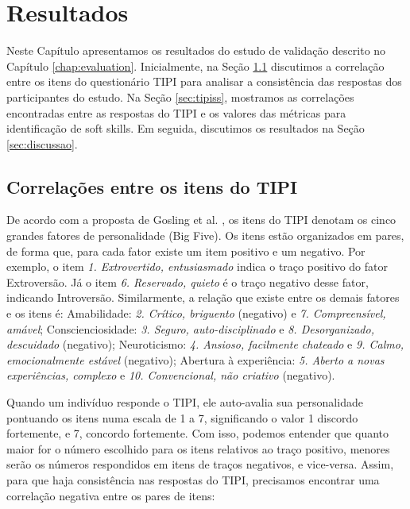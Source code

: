 

\chapter{Resultados}

\label{chap:results}

Neste Capítulo apresentamos os resultados do estudo de validação descrito no Capítulo \ref{chap:evaluation}. Inicialmente, na Seção \ref{sec:tipitipi} discutimos a correlação entre os itens do questionário TIPI para analisar a consistência das respostas dos participantes do estudo. Na Seção \ref{sec:tipiss}, mostramos as correlações encontradas entre as respostas do TIPI e os valores das métricas para identificação de soft skills. Em seguida, discutimos os resultados na Seção \ref{sec:discussao}.

\section{Correlações entre os itens do TIPI}
\label{sec:tipitipi}

De acordo com a proposta de Gosling et al. \cite{gosling:03}, os itens do TIPI denotam os cinco grandes fatores de personalidade (Big Five). Os itens estão organizados em pares, de forma que,
para cada fator existe um item positivo e um negativo.
Por exemplo, o item \textit{1. Extrovertido, entusiasmado} indica o traço positivo do fator Extroversão. Já o item \textit{6. Reservado, quieto} é o traço negativo desse fator, indicando Introversão.
Similarmente, a relação que existe entre os demais fatores e os itens é:
Amabilidade: \textit{2. Crítico, briguento} (negativo) e \textit{7. Compreensível, amável}; 
Conscienciosidade: \textit{3. Seguro, auto-disciplinado} e \textit{8. Desorganizado, descuidado} (negativo);
Neuroticismo: \textit{4. Ansioso, facilmente chateado} e \textit{9. Calmo, emocionalmente estável} (negativo);
Abertura à experiência: \textit{5. Aberto a novas experiências, complexo} e \textit{10. Convencional, não criativo} (negativo).

Quando um indivíduo responde o TIPI, ele auto-avalia sua personalidade pontuando os itens numa escala de 1 a 7, significando o valor 1 discordo fortemente, e 7, concordo fortemente.
Com isso, podemos entender que quanto maior for o número escolhido para os itens relativos ao traço positivo, menores serão os números respondidos em itens de traços negativos, e vice-versa. Assim, para que haja consistência nas respostas do TIPI, precisamos encontrar uma correlação negativa entre os pares de itens:

